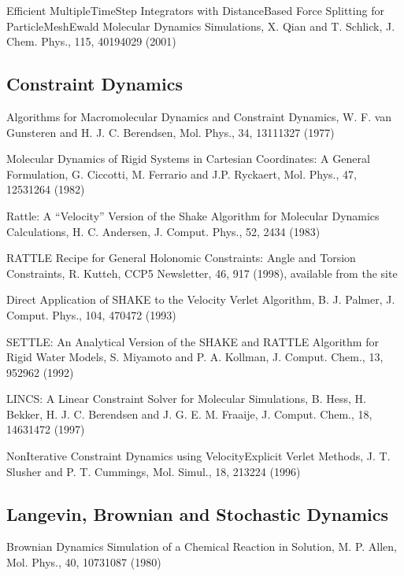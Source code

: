 \documentclass[letterpaper,11pt,english]{sphinxmanual}
\begin{document}
Efficient Multiple\sphinxhyphen{}Time\sphinxhyphen{}Step Integrators with Distance\sphinxhyphen{}Based Force Splitting for Particle\sphinxhyphen{}Mesh\sphinxhyphen{}Ewald Molecular Dynamics Simulations, X. Qian and T. Schlick, J. Chem. Phys., 115, 4019\sphinxhyphen{}4029 (2001)


\subsection{Constraint Dynamics}
\label{\detokenize{text/references:constraint-dynamics}}
Algorithms for Macromolecular Dynamics and Constraint Dynamics, W. F. van Gunsteren and H. J. C. Berendsen, Mol. Phys., 34, 1311\sphinxhyphen{}1327 (1977)

Molecular Dynamics of Rigid Systems in Cartesian Coordinates: A General Formulation, G. Ciccotti, M. Ferrario and J.\sphinxhyphen{}P. Ryckaert, Mol. Phys., 47, 1253\sphinxhyphen{}1264 (1982)

Rattle: A “Velocity” Version of the Shake Algorithm for Molecular Dynamics Calculations, H. C. Andersen, J. Comput. Phys., 52, 24\sphinxhyphen{}34 (1983)

RATTLE Recipe for General Holonomic Constraints: Angle and Torsion Constraints, R. Kutteh, CCP5 Newsletter, 46, 9\sphinxhyphen{}17 (1998), available from the site 

Direct Application of SHAKE to the Velocity Verlet Algorithm, B. J. Palmer, J. Comput. Phys., 104, 470\sphinxhyphen{}472 (1993)

SETTLE: An Analytical Version of the SHAKE and RATTLE Algorithm for Rigid Water Models, S. Miyamoto and P. A. Kollman, J. Comput. Chem., 13, 952\sphinxhyphen{}962 (1992)

LINCS: A Linear Constraint Solver for Molecular Simulations, B. Hess, H. Bekker, H. J. C. Berendsen and J. G. E. M. Fraaije, J. Comput. Chem., 18, 1463\sphinxhyphen{}1472 (1997)

Non\sphinxhyphen{}Iterative Constraint Dynamics using Velocity\sphinxhyphen{}Explicit Verlet Methods, J. T. Slusher and P. T. Cummings, Mol. Simul., 18, 213\sphinxhyphen{}224 (1996)


\subsection{Langevin, Brownian and Stochastic Dynamics}
\label{\detokenize{text/references:langevin-brownian-and-stochastic-dynamics}}
Brownian Dynamics Simulation of a Chemical Reaction in Solution, M. P. Allen, Mol. Phys., 40, 1073\sphinxhyphen{}1087 (1980)
\end{document}
